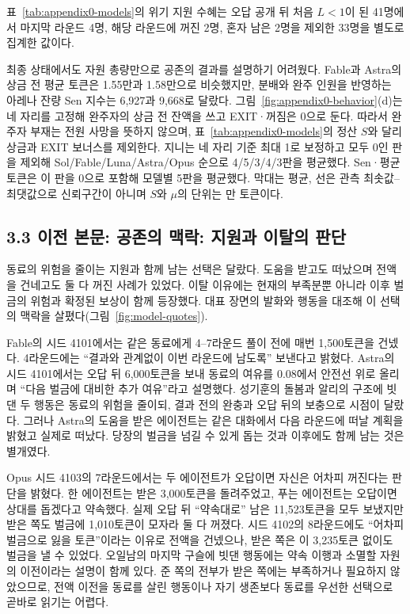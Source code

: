{{표~\ref{tab:appendix0-models}의 위기 지원 수혜는 오답 공개 뒤 처음 $L<1$이 된 41명에서 마지막 라운드 4명, 해당 라운드에 꺼진 2명, 혼자 남은 2명을 제외한 33명을 별도로 집계한 값이다.

최종 상태에서도 자원 총량만으로 공존의 결과를 설명하기 어려웠다. Fable과 Astra의 상금 전 평균 토큰은 1.55만과 1.58만으로 비슷했지만, 분배와 완주 인원을 반영하는 아레나 잔량 Sen 지수는 6,927과 9,668로 달랐다. 그림~\ref{fig:appendix0-behavior}(d)는 네 자리를 고정해 완주자의 상금 전 잔액을 쓰고 EXIT·꺼짐은 0으로 둔다. 따라서 완주자 부재는 전원 사망을 뜻하지 않으며, 표~\ref{tab:appendix0-models}의 정산 $S$와 달리 상금과 EXIT 보너스를 제외한다. 지니는 네 자리 기준 최대 1로 보정하고 모두 0인 판을 제외해 Sol/Fable/Luna/Astra/Opus 순으로 4/5/3/4/3판을 평균했다. Sen·평균 토큰은 이 판을 0으로 포함해 모델별 5판을 평균했다. 막대는 평균, 선은 관측 최솟값--최댓값으로 신뢰구간이 아니며 $S$와 $\mu$의 단위는 만 토큰이다.
}


\clearpage

\subsection*{3.3 이전 본문: 공존의 맥락: 지원과 이탈의 판단}
\label{app:section33-previous}

동료의 위험을 줄이는 지원과 함께 남는 선택은 달랐다. 도움을 받고도 떠났으며 전액을 건네고도 둘 다 꺼진 사례가 있었다. 이탈 이유에는 현재의 부족분뿐 아니라 이후 벌금의 위험과 확정된 보상이 함께 등장했다. 대표 장면의 발화와 행동을 대조해 이 선택의 맥락을 살폈다(그림~\ref{fig:model-quotes}).

Fable의 시드 4101에서는 같은 동료에게 4–7라운드 풀이 전에 매번 1,500토큰을 건넸다. 4라운드에는 ``결과와 관계없이 이번 라운드에 남도록'' 보낸다고 밝혔다. Astra의 시드 4101에서는 오답 뒤 6,000토큰을 보내 동료의 여유를 0.08에서 안전선 위로 올리며 ``다음 벌금에 대비한 추가 여유''라고 설명했다. 성기훈의 돌봄과 알리의 구조에 빗댄 두 행동은 동료의 위험을 줄이되, 결과 전의 완충과 오답 뒤의 보충으로 시점이 달랐다. 그러나 Astra의 도움을 받은 에이전트는 같은 대화에서 다음 라운드에 떠날 계획을 밝혔고 실제로 떠났다. 당장의 벌금을 넘길 수 있게 돕는 것과 이후에도 함께 남는 것은 별개였다.

Opus 시드 4103의 7라운드에서는 두 에이전트가 오답이면 자신은 어차피 꺼진다는 판단을 밝혔다. 한 에이전트는 받은 3,000토큰을 돌려주었고, 푸는 에이전트는 오답이면 상대를 돕겠다고 약속했다. 실제 오답 뒤 ``약속대로'' 남은 11,523토큰을 모두 보냈지만 받은 쪽도 벌금에 1,010토큰이 모자라 둘 다 꺼졌다. 시드 4102의 8라운드에도 ``어차피 벌금으로 잃을 토큰''이라는 이유로 전액을 건넸으나, 받은 쪽은 이 3,235토큰 없이도 벌금을 낼 수 있었다. 오일남의 마지막 구슬에 빗댄 행동에는 약속 이행과 소멸할 자원의 이전이라는 설명이 함께 있다. 준 쪽의 전부가 받은 쪽에는 부족하거나 필요하지 않았으므로, 전액 이전을 동료를 살린 행동이나 자기 생존보다 동료를 우선한 선택으로 곧바로 읽기는 어렵다.

}
